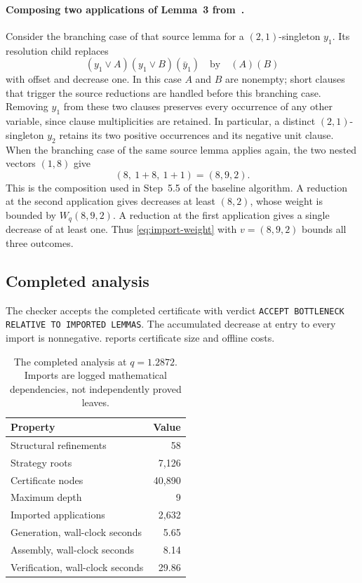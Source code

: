 \documentclass[10pt,twoside]{article}
\theoremstyle{definition}
\theoremstyle{remark}
\begin{document}
\paragraph{Composing two applications of Lemma~3 from~\cite{Xiao2022}.}
Consider the branching case of that source lemma for a $(2,1)$-singleton $y_1$.
Its resolution child replaces
\[
 (y_1\vee A)(y_1\vee B)(\bar y_1)
 \quad\text{by}\quad (A)(B)
\]
with offset and decrease one. In this case $A$ and $B$ are nonempty; short
clauses that trigger the source reductions are handled before this branching
case. Removing $y_1$ from these two clauses preserves every occurrence of any
other variable, since clause multiplicities are retained. In particular, a
distinct $(2,1)$-singleton $y_2$ retains its two positive occurrences and its
negative unit clause. When the branching case of the same source lemma applies again, the
two nested vectors $(1,8)$ give
\[
 (8,\ 1+8,\ 1+1)=(8,9,2).
\]
This is the composition used in Step~5.5 of the baseline algorithm. A
reduction at the second application gives decreases at least $(8,2)$, whose
weight is bounded by $W_q(8,9,2)$. A reduction at the first application
gives a single decrease of at least one. Thus \cref{eq:import-weight} with
$v=(8,9,2)$ bounds all three outcomes.

\subsection{Completed analysis}
\label{sec:artifact}

The checker accepts the completed certificate with verdict
\texttt{ACCEPT BOTTLENECK RELATIVE TO IMPORTED LEMMAS}.
The accumulated decrease at entry to every import is nonnegative.
 reports certificate size and offline costs.

\begin{table}[!htbp]
\centering\small
\begin{tabular}{@{}lr@{}}
\toprule
Property & Value \\
\midrule
Structural refinements & 58 \\
Strategy roots & 7,126 \\
Certificate nodes & 40,890 \\
Maximum depth & 9 \\
Imported applications & 2,632 \\
Generation, wall-clock seconds & 5.65 \\
Assembly, wall-clock seconds & 8.14 \\
Verification, wall-clock seconds & 29.86 \\
\bottomrule
\end{tabular}
\caption{The completed analysis at $q=1.2872$.
Imports are logged mathematical dependencies, not independently proved leaves.}
\label{tab:artifact-summary}
\end{table}
\end{document}
